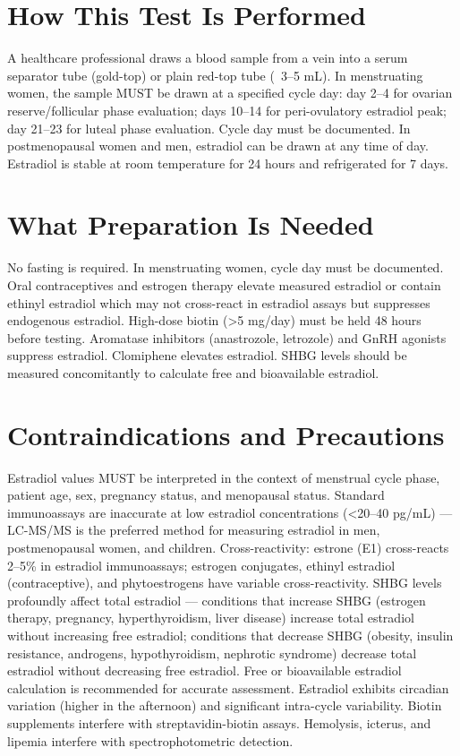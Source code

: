 \section*{How This Test Is Performed}
A healthcare professional draws a blood sample from a vein into a serum separator tube (gold-top) or plain red-top tube (~3--5 mL). In menstruating women, the sample MUST be drawn at a specified cycle day: day 2--4 for ovarian reserve/follicular phase evaluation; days 10--14 for peri-ovulatory estradiol peak; day 21--23 for luteal phase evaluation. Cycle day must be documented. In postmenopausal women and men, estradiol can be drawn at any time of day. Estradiol is stable at room temperature for 24 hours and refrigerated for 7 days.

\section*{What Preparation Is Needed}
No fasting is required. In menstruating women, cycle day must be documented. Oral contraceptives and estrogen therapy elevate measured estradiol or contain ethinyl estradiol which may not cross-react in estradiol assays but suppresses endogenous estradiol. High-dose biotin (>5 mg/day) must be held 48 hours before testing. Aromatase inhibitors (anastrozole, letrozole) and GnRH agonists suppress estradiol. Clomiphene elevates estradiol. SHBG levels should be measured concomitantly to calculate free and bioavailable estradiol.

\section*{Contraindications and Precautions}
Estradiol values MUST be interpreted in the context of menstrual cycle phase, patient age, sex, pregnancy status, and menopausal status. Standard immunoassays are inaccurate at low estradiol concentrations (<20--40 pg/mL) --- LC-MS/MS is the preferred method for measuring estradiol in men, postmenopausal women, and children. Cross-reactivity: estrone (E1) cross-reacts 2--5\% in estradiol immunoassays; estrogen conjugates, ethinyl estradiol (contraceptive), and phytoestrogens have variable cross-reactivity. SHBG levels profoundly affect total estradiol --- conditions that increase SHBG (estrogen therapy, pregnancy, hyperthyroidism, liver disease) increase total estradiol without increasing free estradiol; conditions that decrease SHBG (obesity, insulin resistance, androgens, hypothyroidism, nephrotic syndrome) decrease total estradiol without decreasing free estradiol. Free or bioavailable estradiol calculation is recommended for accurate assessment. Estradiol exhibits circadian variation (higher in the afternoon) and significant intra-cycle variability. Biotin supplements interfere with streptavidin-biotin assays. Hemolysis, icterus, and lipemia interfere with spectrophotometric detection.

